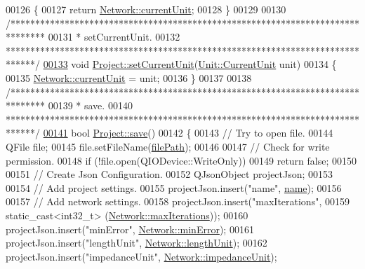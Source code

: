 \begin{DoxyCode}
00126 \{
00127   \textcolor{keywordflow}{return} \hyperlink{group___models_gac6a26db5fef2b1dd2a00faf6340d1702}{Network::currentUnit};
00128 \}
00129 
00130 \textcolor{comment}{/*******************************************************************************}
00131 \textcolor{comment}{ * setCurrentUnit.}
00132 \textcolor{comment}{ ******************************************************************************/}
\hypertarget{project_8cpp_source_l00133}{}\hyperlink{class_project_a64d9800bc3acafcfa4d3f45ee5aacc6d}{00133} \textcolor{keywordtype}{void} \hyperlink{class_project_a64d9800bc3acafcfa4d3f45ee5aacc6d}{Project::setCurrentUnit}(\hyperlink{class_unit_a0794cf6c9682f48296dd4a5315389787}{Unit::CurrentUnit} unit)
00134 \{
00135   \hyperlink{group___models_gac6a26db5fef2b1dd2a00faf6340d1702}{Network::currentUnit} = unit;
00136 \}
00137 
00138 \textcolor{comment}{/*******************************************************************************}
00139 \textcolor{comment}{ * save.}
00140 \textcolor{comment}{ ******************************************************************************/}
\hypertarget{project_8cpp_source_l00141}{}\hyperlink{class_project_a596a875bc5be73bc5b1b71b6448c1e07}{00141} \textcolor{keywordtype}{bool} \hyperlink{class_project_a596a875bc5be73bc5b1b71b6448c1e07}{Project::save}()
00142 \{
00143   \textcolor{comment}{// Try to open file.}
00144   QFile file;
00145   file.setFileName(\hyperlink{class_project_a79f30adcefd0b72bd4ac7db724bc9531}{filePath});
00146 
00147   \textcolor{comment}{// Check for write permission.}
00148   \textcolor{keywordflow}{if} (!file.open(QIODevice::WriteOnly))
00149     \textcolor{keywordflow}{return} \textcolor{keyword}{false};
00150 
00151   \textcolor{comment}{// Create Json Configuration.}
00152   QJsonObject projectJson;
00153 
00154   \textcolor{comment}{// Add project settings.}
00155   projectJson.insert(\textcolor{stringliteral}{"name"}, \hyperlink{class_project_a82dd2d1bc38f9fd08c9a811fcaa76b38}{name});
00156 
00157   \textcolor{comment}{// Add network settings.}
00158   projectJson.insert(\textcolor{stringliteral}{"maxIterations"},
00159                      static\_cast<int32\_t> (\hyperlink{group___models_ga318dee060bc577eacd67d332efbbe1b2}{Network::maxIterations}));
00160   projectJson.insert(\textcolor{stringliteral}{"minError"}, \hyperlink{group___models_gabcdc973129d3dda7572b7a1c388da1b5}{Network::minError});
00161   projectJson.insert(\textcolor{stringliteral}{"lengthUnit"}, \hyperlink{group___models_gae46c0e2bf39b343875e3c69066fe2652}{Network::lengthUnit});
00162   projectJson.insert(\textcolor{stringliteral}{"impedanceUnit"}, \hyperlink{group___models_ga5f3d72699a723c64a89d22e34df708ff}{Network::impedanceUnit});

\end{DoxyCode}
